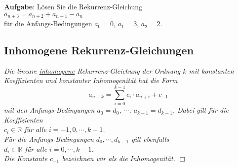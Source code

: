 \noindent
\textbf{Aufgabe}: L\"{o}sen Sie die Rekurrenz-Gleichung \\[0.2cm]
\hspace*{1.3cm} $a_{n+3} = a_{n+2} + a_{n+1} - a_n$ \\[0.2cm]
f\"{u}r die Anfangs-Bedingungen $a_0 = 0$, $a_1 = 3$, $a_2 = 2$.

\pagebreak

\subsection{Inhomogene Rekurrenz-Gleichungen}    
\begin{Definition} \lb
{\em Die \emph{lineare \underline{inhomo}g\underline{ene} Rekur\-renz-Gleichung der Ordnung
$k$ mit konstanten Koeffizienten und konstanter Inhomogenit\"{a}t} hat die Form 
\begin{equation}
  \label{eq:lihrg}
     a_{n+k} = \sum\limits_{i=0}^{k-1} c_{i} \cdot a_{n+i} + c_{-1}  
\end{equation}
     mit den Anfangs-Bedingungen $a_0 = d_0$, $\cdots$, $a_{k-1} = d_{k-1}$. 
     Dabei gilt f\"{u}r die Koeffizienten \\[0.2cm]
     \hspace*{1.3cm} $c_i \in \mathbb{R}$ \quad f\"{u}r alle $i = -1, 0,\cdots, k-1$. \\[0.2cm]
     F\"{u}r die  \emph{Anfangs-Bedingungen} $d_0, \cdots, d_{k-1}$ gilt ebenfalls \\[0.2cm]
     \hspace*{1.3cm} $d_i \in \mathbb{R}$ \quad f\"{u}r alle $i = 0,\cdots, k-1$. \\[0.2cm]
     Die Konstante $c_{-1}$ bezeichnen wir als die \emph{Inhomogenit\"{a}t}. 
     \hspace*{\fill} $\Box$
}
\end{Definition}

